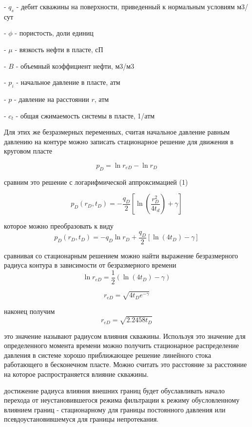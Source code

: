 \documentclass[oneside, openany]{memoir}
\begin{document}
	- $q_s$ - дебит скважины на поверхности, приведенный к нормальным условиям м3/сут
	
	- $\phi$ - пористость, доли единиц
	
	- $\mu$ - вязкость нефти в пласте, сП
	
	- $B$ - объемный коэффициент нефти, м3/м3
	
	- $p_i$ - начальное давление в пласте, атм
	
	- $p$ - давление на расстоянии $r$, атм
	
	- $c_t$ - общая сжимаемость системы в пласте, 1/атм
	
	Для этих же безразмерных переменных, считая начальное давление равным давлению на контуре можно записать стационарное решение для движения в круговом пласте
	
	$$p_D = \ln r_{eD} - \ln r_D $$
	
	сравним это решение с логарифмической аппроксимацией (1)
	
	$$p_D(r_D,t_D) = - \frac{q_D}{2} \left[ \ln \left( \dfrac{ r_D^2}{4t_d} \right) +\gamma \right] $$
	
	которое можно преобразовать к виду
	$$p_D(r_D,t_D) = - q_D \ln r_D  + \frac{q_D}{2} \left[ \ln(4t_D)   -\gamma \right] $$
	
	сравнивая со стационарным решением можно найти выражение безразмерного радиуса контура в зависимости от безразмерного времени
	$$\ln r_{eD} = \frac{1}{2}(\ln(4t_D)-\gamma) $$
	
	$$r_{eD} =  \sqrt { 4t_D e^{-\gamma} }  $$
	
	наконец получим
	$$r_{eD} = \sqrt {2.2458 t_D} $$
	
	это значение называют радиусом влияния скважины. Используя это значение для определенного момента времени можно получить стационарное распределение давления в системе хорошо приближающее решение линейного стока работающего в бесконечном пласте. Можно считать это расстояние за расстояние на которое распространяется влияние скважины.
	
	достижение радиуса влияния внешних границ будет обуславливать начало перехода от неустановившегося режима фильтрации к режиму обусловленному влиянием границ - стационарному для границы постоянного давления или псевдоустановившемуся для границы непротекания.
	
	\printbibliography
\end{document}
